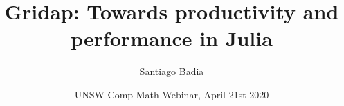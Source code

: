 \documentclass[12pt,xcolor={dvipsnames}]{beamer}      %
\title[]{Gridap: Towards productivity and performance in Julia}
\author[S. Badia]{{Santiago Badia}}
\date{\small UNSW Comp Math Webinar, April 21st 2020}
\begin{document}
\addtocounter{framenumber}{-1}
\frame[plain]{
  \titlepage
}

\makeatletter
\newcommand{\opnorm}{\@ifstar\@opnorms\@opnorm}
\newcommand{\@opnorms}[1]{%
    \left|\mkern-1.5mu\left|\mkern-1.5mu\left|
       #1
         \right|\mkern-1.5mu\right|\mkern-1.5mu\right|
       }
       \newcommand{\@opnorm}[2][]{%
           \mathopen{#1|\mkern-1.5mu#1|\mkern-1.5mu#1|}
             #2
               \mathclose{#1|\mkern-1.5mu#1|\mkern-1.5mu#1|}
             }
             \makeatother



\end{document}
